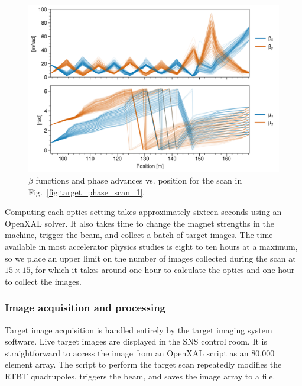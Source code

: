 \begin{figure}[!p]
    \centering
    \includegraphics[width=\textwidth]{Images/chapter4/target_phase_scan2.png}
    \caption{$\beta$ functions and phase advances vs. position for the scan in Fig.~\ref{fig:target_phase_scan_1}.}
    \label{fig:target_phase_scan_2}
\end{figure}
%

Computing each optics setting takes approximately sixteen seconds using an OpenXAL solver. It also takes time to change the magnet strengths in the machine, trigger the beam, and collect a batch of target images. The time available in most accelerator physics studies is eight to ten hours at a maximum, so we place an upper limit on the number of images collected during the scan at $15 \times 15$, for which it takes around one hour to calculate the optics and one hour to collect the images. 


\subsubsection{Image acquisition and processing}

Target image acquisition is handled entirely by the target imaging system software. Live target images are displayed in the SNS control room. It is straightforward to access the image from an OpenXAL script as an 80,000 element array. The script to perform the target scan repeatedly modifies the RTBT quadrupoles, triggers the beam, and saves the image array to a file.

